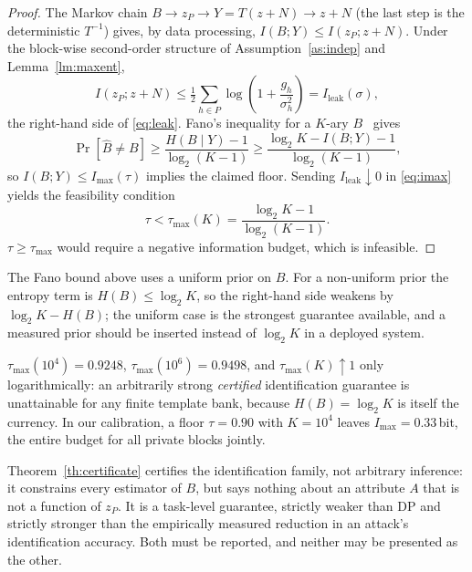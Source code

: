\begin{proof}
The Markov chain $B\to z_P\to Y=T(z+N)\to z+N$ (the last step is the
deterministic $T^{-1}$) gives, by data processing,
$I(B;Y)\le I(z_P;z+N)$. Under the block-wise second-order
structure of Assumption~\ref{as:indep} and Lemma~\ref{lm:maxent},
\begin{equation}
I(z_P;z+N)\le\tfrac12\!\!\sum_{h\in P}\!\log\!\left(1+\frac{g_h}{\sigma_h^{2}}\right)
= I_{\mathrm{leak}}(\sigma),
\label{eq:cert-bound}
\end{equation}
the right-hand side of \eqref{eq:leak}. Fano's inequality for a $K$-ary $B$~\cite{fano}
gives
\begin{equation}
\Pr[\widehat B\neq B]\ge\frac{H(B\mid Y)-1}{\log_2(K-1)}
\ge\frac{\log_2 K-I(B;Y)-1}{\log_2(K-1)},
\end{equation}
so $I(B;Y)\le I_{\max}(\tau)$ implies the claimed floor. Sending
$I_{\mathrm{leak}}\downarrow0$ in \eqref{eq:imax} yields the feasibility
condition
\begin{equation}
\tau<\tau_{\max}(K)=\frac{\log_2K-1}{\log_2(K-1)}.
\label{eq:taumax}
\end{equation}
$\tau\ge\tau_{\max}$ would require a negative information budget, which is
infeasible.
\end{proof}

The Fano bound above uses a uniform prior on $B$. For a non-uniform prior the
entropy term is $H(B)\le\log_2K$, so the right-hand side weakens by
$\log_2K-H(B)$; the uniform case is the strongest guarantee available, and a
measured prior should be inserted instead of $\log_2K$ in a deployed system.

\begin{corollary}[Numbers]
\label{co:numbers}
$\tau_{\max}(10^{4})=0.9248$, $\tau_{\max}(10^{6})=0.9498$, and
$\tau_{\max}(K)\uparrow1$ only logarithmically: an arbitrarily strong
\emph{certified} identification guarantee is unattainable for any finite
template bank, because $H(B)=\log_2K$ is itself the currency. In our
calibration, a floor $\tau=0.90$ with $K=10^{4}$ leaves
$I_{\max}=0.33$\,bit, the entire budget for all private blocks jointly.
\end{corollary}

\begin{remark}
\label{rm:scope}
Theorem~\ref{th:certificate} certifies the identification family, not
arbitrary inference: it constrains every estimator of $B$, but says nothing
about an attribute $A$ that is not a function of $z_P$. It is a
task-level guarantee, strictly weaker than DP and strictly stronger than the
empirically measured reduction in an attack's identification accuracy.
Both must be reported, and neither may be presented as the other.
\end{remark}


